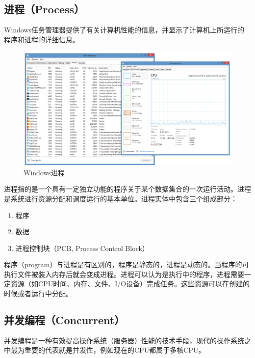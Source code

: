 \vspace{0.5cm}

\subsection{进程（Process）}

Windows任务管理器提供了有关计算机性能的信息，并显示了计算机上所运行的程序和进程的详细信息。

\begin{figure}[H]
	\centering
	\includegraphics[scale=0.6]{img/C11/11-1/2.png}
	\caption{Windows进程}
\end{figure}

进程指的是一个具有一定独立功能的程序关于某个数据集合的一次运行活动。进程是系统进行资源分配和调度运行的基本单位。进程实体中包含三个组成部分：

\begin{enumerate}
	\item 程序
	\item 数据
	\item 进程控制块（PCB, Process Control Block）
\end{enumerate}

程序（program）与进程是有区别的，程序是静态的，进程是动态的。当程序的可执行文件被装入内存后就会变成进程。进程可以认为是执行中的程序，进程需要一定资源（如CPU时间、内存、文件、I/O设备）完成任务。这些资源可以在创建的时候或者运行中分配。\\

\subsection{并发编程（Concurrent）}

并发编程是一种有效提高操作系统（服务器）性能的技术手段，现代的操作系统之中最为重要的代表就是并发性，例如现在的CPU都属于多核CPU。\\

